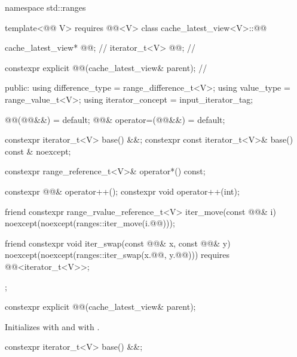 %
\begin{codeblock}
namespace std::ranges {
  template<@@ V>
    requires @@<V>
  class cache_latest_view<V>::@@ {
    cache_latest_view* @@;                                 // \expos
    iterator_t<V> @@;                                     // \expos

    constexpr explicit @@(cache_latest_view& parent);     // \expos

  public:
    using difference_type = range_difference_t<V>;
    using value_type = range_value_t<V>;
    using iterator_concept = input_iterator_tag;

    @@(@@&&) = default;
    @@& operator=(@@&&) = default;

    constexpr iterator_t<V> base() &&;
    constexpr const iterator_t<V>& base() const & noexcept;

    constexpr range_reference_t<V>& operator*() const;

    constexpr @@& operator++();
    constexpr void operator++(int);

    friend constexpr range_rvalue_reference_t<V> iter_move(const @@& i)
      noexcept(noexcept(ranges::iter_move(i.@@)));

    friend constexpr void iter_swap(const @@& x, const @@& y)
      noexcept(noexcept(ranges::iter_swap(x.@@, y.@@)))
      requires @@<iterator_t<V>>;
  };
}
\end{codeblock}

%
\begin{itemdecl}
constexpr explicit @@(cache_latest_view& parent);
\end{itemdecl}

\begin{itemdescr}
\pnum
\effects
Initializes  with
and  with .
\end{itemdescr}

%
\begin{itemdecl}
constexpr iterator_t<V> base() &&;
\end{itemdecl}

